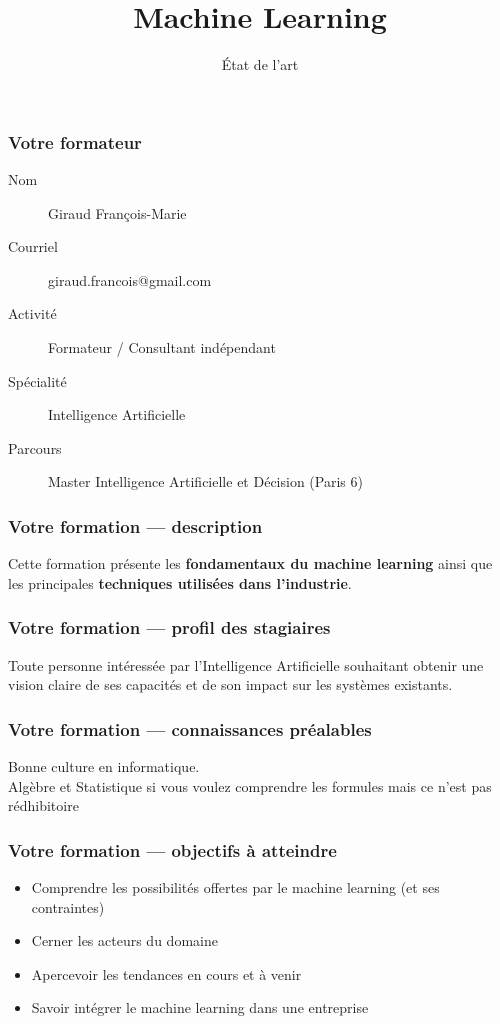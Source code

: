 \documentclass{formation}
\title{Machine Learning}
\subtitle{État de l'art}
\begin{document}
\maketitle

\begin{frame}
  \frametitle{Votre formateur}
  \begin{description}
  \item[Nom] Giraud François-Marie
  \item[Courriel] giraud.francois@gmail.com
  \item[Activité] Formateur / Consultant indépendant
  \item[Spécialité] Intelligence Artificielle
  \item[Parcours] Master Intelligence Artificielle et Décision (Paris 6)
  \end{description}
\end{frame}

\begin{frame}
  \frametitle{Votre formation — description}
  Cette formation présente les \textbf{fondamentaux du machine learning} ainsi que les principales \textbf{techniques utilisées dans l’industrie}.
\end{frame}

\begin{frame}
  \frametitle{Votre formation — profil des stagiaires}
  Toute personne intéressée par l'Intelligence Artificielle souhaitant obtenir une vision claire de ses capacités et de son impact sur les systèmes existants.
\end{frame}

\begin{frame}
  \frametitle{Votre formation — connaissances préalables}
  Bonne culture en informatique. \\
  Algèbre et Statistique si vous voulez comprendre les formules mais ce n'est pas rédhibitoire
\end{frame}

\begin{frame}
  \frametitle{Votre formation — objectifs à atteindre}
  \begin{itemize}
  \item Comprendre les possibilités offertes par le machine learning (et ses contraintes)
  \item Cerner les acteurs du domaine
  \item Apercevoir les tendances en cours et à venir
  \item Savoir intégrer le machine learning dans une entreprise
  \end{itemize}
\end{frame}
\end{document}
